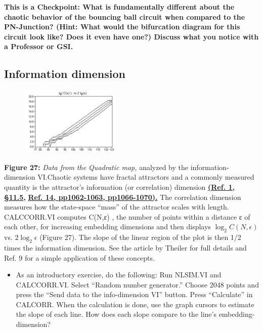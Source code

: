 \documentclass{../lab}
\begin{document}
\textbf{ This is a Checkpoint: What is fundamentally different about the chaotic behavior of the bouncing ball circuit when compared to the PN-Junction? (Hint: What would the bifurcation diagram for this circuit look like? Does it even have one?) Discuss what you notice with a Professor or GSI.}

\subsection{Information dimension}

\begin{figure}[h]
    \centering
    \href{http://experimentationlab.berkeley.edu/sites/default/files/images/180px-Nldimage133.gif}{\includegraphics[width=0.5\linewidth]{images/180px-Nldimage133.png}}
    \caption{}
    \label{fig:180px-Nldimage133}
\end{figure}




\textbf{Figure 27:} \emph{Data from the Quadratic map,} analyzed by the information-dimension VI.Chaotic systems have fractal attractors and a commonly measured quantity is the attractor's information (or correlation) dimension \href{http://physics111.lib.berkeley.edu/Physics111/Reprints/NLD/Strogatz\_Nonlinear\_dynamics\_chaos.pdf}{\textbf{(\textbf{Ref. 1, §11.5}}}\textbf{,} \href{http://physics111.lib.berkeley.edu/Physics111/Reprints/NLD/estimatingfractaldimension.pdf}{\textbf{\textbf{Ref. 14, pp1062-1063, pp1066-1070).}}} The correlation dimension measures how the state-space ``mass'' of the attractor scales with length. CALCCORR.VI computes C(N,ε) , the number of points within a distance ε of each other, for increasing embedding dimensions and then displays $ \log_{2}C(N,\epsilon) $ vs. $ 2\log_{2}\epsilon $ (Figure 27). The slope of the linear region of the plot is then 1/2 times the information dimension. See the article by Theiler for full details and Ref. 9 for a simple application of these concepts.

\begin{itemize}
    \item As an introductory exercise, do the following: Run NLSIM.VI and CALCCORR.VI. Select ``Random number generator.'' Choose 2048 points and press the ``Send data to the info-dimension VI'' button. Press ``Calculate'' in CALCORR. When the calculation is done, use the graph cursors to estimate the slope of each line. How does each slope compare to the line's embedding-dimension?

\end{itemize}
\end{document}
